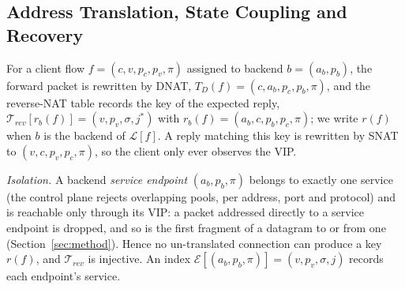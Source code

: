 \documentclass[conference]{IEEEtran}
\begin{document}
\subsection{Address Translation, State Coupling and Recovery}
\label{sec:coupling}
For a client flow $f=(c,v,p_c,p_v,\pi)$ assigned to backend $b=(a_b,p_b)$, the
forward packet is rewritten by DNAT, $T_D(f)=(c,a_b,p_c,p_b,\pi)$, and the
reverse-NAT table records the key of the expected reply,
$\mathcal{T}_{rev}[r_b(f)] = (v,p_v,\sigma,j^*)$ with
$r_b(f)=(a_b,c,p_b,p_c,\pi)$; we write $r(f)$ when $b$ is the backend of
$\mathcal{L}[f]$. A reply matching this key is rewritten by SNAT to
$(v,c,p_v,p_c,\pi)$, so the client only ever observes the VIP.

\textit{Isolation.} A backend \emph{service endpoint} $(a_b,p_b,\pi)$ belongs
to exactly one service (the control plane rejects overlapping pools, per
address, port and protocol) and is reachable only through its VIP: a packet
addressed directly to a service endpoint is dropped, and so is the first
fragment of a datagram to or from one (Section~\ref{sec:method}). Hence no un-translated
connection can produce a key $r(f)$, and $\mathcal{T}_{rev}$ is injective. An
index $\mathcal{E}[(a_b,p_b,\pi)] = (v,p_v,\sigma,j)$ records each endpoint's
service.
\end{document}

